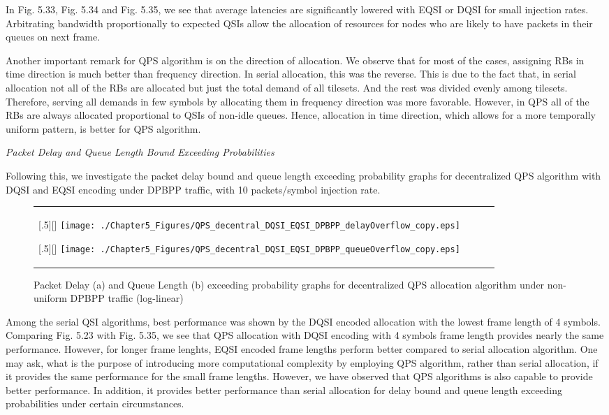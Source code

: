 In Fig. 5.33, Fig. 5.34 and Fig. 5.35, we see that average latencies are significantly lowered with EQSI or DQSI for small injection rates. Arbitrating bandwidth proportionally to expected QSIs allow the allocation of resources for nodes who are likely to have packets in their queues on next frame. 

Another important remark for QPS algorithm is on the direction of allocation. We observe that for most of the cases, assigning RBs in time direction is much better than frequency direction. In serial allocation, this was the reverse. This is due to the fact that, in serial allocation not all of the RBs are allocated but just the total demand of all tilesets. And the rest was divided evenly among tilesets. Therefore, serving all demands in few symbols by allocating them in frequency direction was more favorable. However, in QPS all of the RBs are always allocated proportional to QSIs of non-idle queues. Hence, allocation in time direction, which allows for a more temporally uniform pattern, is better for QPS algorithm. 

\textit{Packet Delay and Queue Length Bound Exceeding Probabilities}


Following this, we investigate the packet delay bound and queue length exceeding probability graphs for decentralized QPS algorithm with DQSI and EQSI encoding under DPBPP traffic, with 10 packets/symbol injection rate. 

\begin{figure*}[htbp]
  \centering
  \begin{tabular}[c]{cccc}

  \subcaptionbox{}[.5\linewidth][]{%
    \texttt{[image: ./Chapter5\_Figures/QPS\_decentral\_DQSI\_EQSI\_DPBPP\_delayOverflow\_copy.eps]} }	
    
  \subcaptionbox{}[.5\linewidth][]{%
    \texttt{[image: ./Chapter5\_Figures/QPS\_decentral\_DQSI\_EQSI\_DPBPP\_queueOverflow\_copy.eps]}}
 
   \end{tabular}

  \caption{Packet Delay (a) and Queue Length (b) exceeding probability graphs for decentralized QPS allocation algorithm under non-uniform DPBPP traffic (log-linear)}
\end{figure*}


Among the serial QSI algorithms, best performance was shown by the DQSI encoded allocation with the lowest frame length of 4 symbols. Comparing Fig. 5.23 with Fig. 5.35, we see that QPS allocation with DQSI encoding with 4 symbols frame length provides nearly the same performance. However, for longer frame lenghts, EQSI encoded frame lengths perform better compared to serial allocation algorithm. One may ask, what is the purpose of introducing more computational complexity by employing QPS algorithm, rather than serial allocation, if it provides the same performance for the small frame lengths. However, we have observed that QPS algorithms is also capable to provide better performance. In addition, it provides better performance than serial allocation for delay bound and queue length exceeding probabilities under certain circumstances. 

